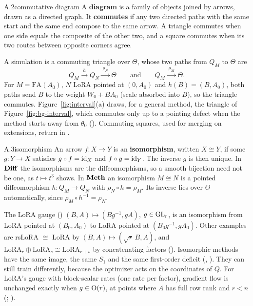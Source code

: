 \begin{bgentry}{A.2}{commutative diagram}
A \textbf{diagram} is a family of objects joined by arrows, drawn as a directed graph. It \textbf{commutes} if any two
directed paths with the same start and the same end compose to the same arrow. A triangle commutes when one side equals
the composite of the other two, and a square commutes when its two routes between opposite corners agree.
\end{bgentry}

A simulation is a commuting triangle over $\Theta$, whose two paths from $Q_M$ to $\Theta$ are
\begin{equation*}
  Q_M\xrightarrow{\;h\;}Q_N\xrightarrow{\;\rho_N\;}\Theta\qquad\text{and}\qquad Q_M\xrightarrow{\;\rho_M\;}\Theta.
\end{equation*}
For $M=\mathrm{FA}(A_0)$, $N$ LoRA pointed at $(0,A_0)$ and $h(B)=(B,A_0)$, both paths send $B$ to the weight
$W_0+BA_0$ (scale absorbed into $B$), so the triangle commutes. Figure~\ref{fig:interval}(a) draws, for a general
method, the triangle of Figure~\ref{fig:bg-interval}, which commutes only up to a pointing defect when the method starts
away from $\theta_0$ (). Commuting squares, used for merging on extensions, return in .


\begin{bgentry}{A.3}{isomorphism}
An arrow $f:X\to Y$ is an \textbf{isomorphism}, written $X\cong Y$, if some $g:Y\to X$ satisfies $g\circ f=\mathrm{id}_X$ and
$f\circ g=\mathrm{id}_Y$. The inverse $g$ is then unique. In $\mathbf{Diff}$ the isomorphisms are the diffeomorphisms, so a smooth
bijection need not be one, as $t\mapsto t^3$ shows. In $\mathbf{Meth}$ an isomorphism $M\cong N$ is a pointed diffeomorphism
$h:Q_M\to Q_N$ with $\rho_N\circ h=\rho_M$. Its inverse lies over $\Theta$ automatically, since
$\rho_M\circ h^{-1}=\rho_N$.
\end{bgentry}

The LoRA gauge () $(B,A)\mapsto(Bg^{-1},gA)$, $g\in\mathrm{GL}_r$, is an isomorphism from LoRA pointed at
$(B_0,A_0)$ to LoRA pointed at $(B_0g^{-1},gA_0)$. Other examples are rsLoRA \citep{kalajdzievski2023rank} $\cong$ LoRA
by $(B,A)\mapsto(\sqrt r\,B,A)$, and $\mathrm{LoRA}_r\oplus\mathrm{LoRA}_s\cong\mathrm{LoRA}_{r+s}$ by concatenating
factors (). Isomorphic methods have the same image, the same $S_1$ and the same first-order deficit
(, ). They can still train differently, because the optimizer acts on the
coordinates of $Q$. For LoRA's gauge with block-scalar rates (one rate per factor), gradient flow is unchanged exactly
when $g\in\mathrm{O}(r)$, at points where $A$ has full row rank and $r<n$ (; ).

